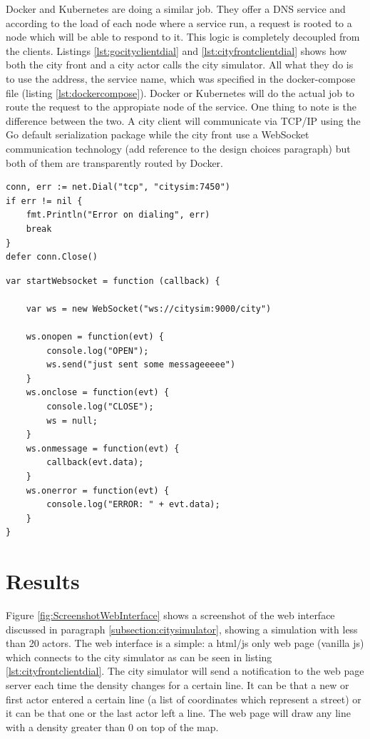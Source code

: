 \documentclass[conference]{IEEEtran}
\begin{document}
Docker and Kubernetes are doing a similar job. They offer a DNS service and according to the load of each node where a service run, a request is rooted to a node which will be able to respond to it. This logic is completely decoupled from the clients. Listings \ref{lst:gocityclientdial} and \ref{lst:cityfrontclientdial} shows how both the city front and a city actor calls the city simulator. All what they do is to use the address, the service name, which was specified in the docker-compose file (listing \ref{lst:dockercompose}). Docker or Kubernetes will do the actual job to route the request to the appropiate node of the service. One thing to note is the difference between the two. A city client will communicate via TCP/IP using the Go default serialization package while the city front use a WebSocket communication technology (add reference to the design choices paragraph) but both of them are transparently routed by Docker.

\begin{lstlisting}[caption=City actor dialing City simulator, label=lst:gocityclientdial]
conn, err := net.Dial("tcp", "citysim:7450")
if err != nil {
    fmt.Println("Error on dialing", err)
    break
}
defer conn.Close()
\end{lstlisting}

\begin{lstlisting}[caption=City front dialing City simulator, label=lst:cityfrontclientdial]
var startWebsocket = function (callback) {

    var ws = new WebSocket("ws://citysim:9000/city")

    ws.onopen = function(evt) {
        console.log("OPEN");
        ws.send("just sent some messageeeee")
    }
    ws.onclose = function(evt) {
        console.log("CLOSE");
        ws = null;
    }
    ws.onmessage = function(evt) {
        callback(evt.data);
    }
    ws.onerror = function(evt) {
        console.log("ERROR: " + evt.data);
    }
}
\end{lstlisting}

\section{Results}
\label{sec:results}

Figure \ref{fig:ScreenshotWebInterface} shows a screenshot of the web interface discussed in paragraph \ref{subsection:citysimulator}, showing a simulation with less than 20 actors. The web interface is a simple: a html/js only web page (vanilla js) which connects to the city simulator as can be seen in listing \ref{lst:cityfrontclientdial}. The city simulator will send a notification to the web page server each time the density changes for a certain line. It can be that a new or first actor entered a certain line (a list of coordinates which represent a street) or it can be that one or the last actor left a line. The web page will draw any line with a density greater than 0 on top of the map.
\end{document}
